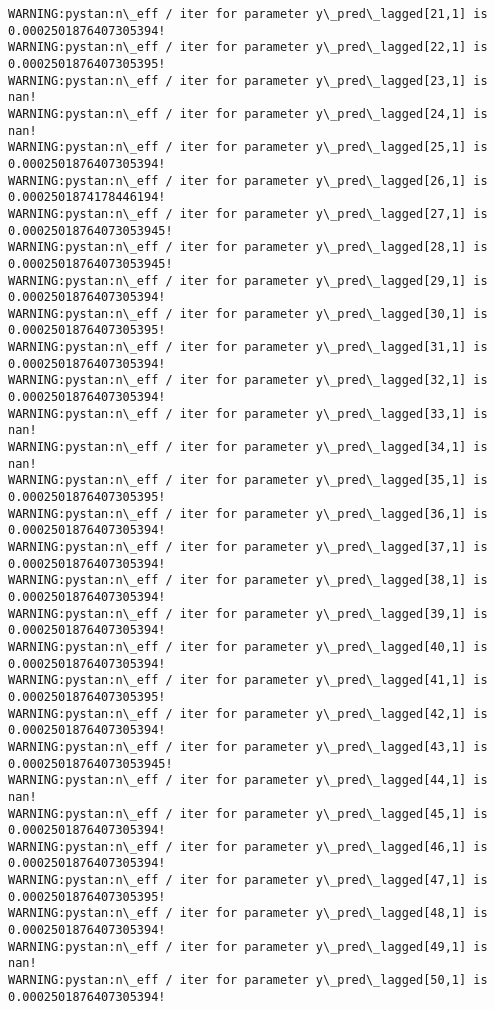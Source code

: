 \documentclass[11pt]{article}
\begin{document}
\begin{Verbatim}[commandchars=\\\{\}]
WARNING:pystan:n\_eff / iter for parameter y\_pred\_lagged[21,1] is 0.0002501876407305394!
WARNING:pystan:n\_eff / iter for parameter y\_pred\_lagged[22,1] is 0.0002501876407305395!
WARNING:pystan:n\_eff / iter for parameter y\_pred\_lagged[23,1] is nan!
WARNING:pystan:n\_eff / iter for parameter y\_pred\_lagged[24,1] is nan!
WARNING:pystan:n\_eff / iter for parameter y\_pred\_lagged[25,1] is 0.0002501876407305394!
WARNING:pystan:n\_eff / iter for parameter y\_pred\_lagged[26,1] is 0.0002501874178446194!
WARNING:pystan:n\_eff / iter for parameter y\_pred\_lagged[27,1] is 0.00025018764073053945!
WARNING:pystan:n\_eff / iter for parameter y\_pred\_lagged[28,1] is 0.00025018764073053945!
WARNING:pystan:n\_eff / iter for parameter y\_pred\_lagged[29,1] is 0.0002501876407305394!
WARNING:pystan:n\_eff / iter for parameter y\_pred\_lagged[30,1] is 0.0002501876407305395!
WARNING:pystan:n\_eff / iter for parameter y\_pred\_lagged[31,1] is 0.0002501876407305394!
WARNING:pystan:n\_eff / iter for parameter y\_pred\_lagged[32,1] is 0.0002501876407305394!
WARNING:pystan:n\_eff / iter for parameter y\_pred\_lagged[33,1] is nan!
WARNING:pystan:n\_eff / iter for parameter y\_pred\_lagged[34,1] is nan!
WARNING:pystan:n\_eff / iter for parameter y\_pred\_lagged[35,1] is 0.0002501876407305395!
WARNING:pystan:n\_eff / iter for parameter y\_pred\_lagged[36,1] is 0.0002501876407305394!
WARNING:pystan:n\_eff / iter for parameter y\_pred\_lagged[37,1] is 0.0002501876407305394!
WARNING:pystan:n\_eff / iter for parameter y\_pred\_lagged[38,1] is 0.0002501876407305394!
WARNING:pystan:n\_eff / iter for parameter y\_pred\_lagged[39,1] is 0.0002501876407305394!
WARNING:pystan:n\_eff / iter for parameter y\_pred\_lagged[40,1] is 0.0002501876407305394!
WARNING:pystan:n\_eff / iter for parameter y\_pred\_lagged[41,1] is 0.0002501876407305395!
WARNING:pystan:n\_eff / iter for parameter y\_pred\_lagged[42,1] is 0.0002501876407305394!
WARNING:pystan:n\_eff / iter for parameter y\_pred\_lagged[43,1] is 0.00025018764073053945!
WARNING:pystan:n\_eff / iter for parameter y\_pred\_lagged[44,1] is nan!
WARNING:pystan:n\_eff / iter for parameter y\_pred\_lagged[45,1] is 0.0002501876407305394!
WARNING:pystan:n\_eff / iter for parameter y\_pred\_lagged[46,1] is 0.0002501876407305394!
WARNING:pystan:n\_eff / iter for parameter y\_pred\_lagged[47,1] is 0.0002501876407305395!
WARNING:pystan:n\_eff / iter for parameter y\_pred\_lagged[48,1] is 0.0002501876407305394!
WARNING:pystan:n\_eff / iter for parameter y\_pred\_lagged[49,1] is nan!
WARNING:pystan:n\_eff / iter for parameter y\_pred\_lagged[50,1] is 0.0002501876407305394!

\end{Verbatim}
\end{document}
